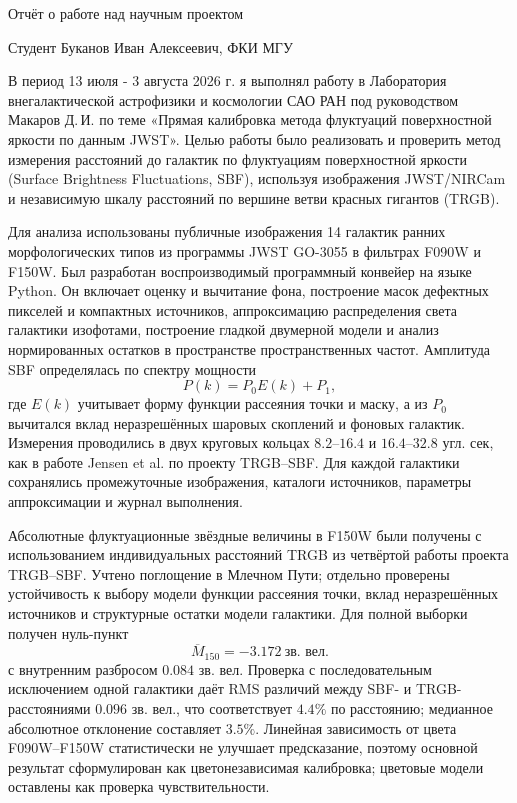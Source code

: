 \documentclass[11pt,letterpaper]{article}
\newcommand{\StudentName}{Буканов Иван Алексеевич}
\newcommand{\StudentOrganization}{ФКИ МГУ}
\newcommand{\ProjectPlace}{Лаборатория внегалактической астрофизики и космологии САО РАН}
\newcommand{\WorkPeriod}{13 июля - 3 августа 2026 г.}
\newcommand{\ProjectTitle}{Прямая калибровка метода флуктуаций поверхностной яркости по данным JWST}
\newcommand{\SupervisorName}{Макаров Д.\,И.}
\begin{document}
\begin{center}
  {\LARGE Отчёт о работе над научным проектом}
\end{center}

\vspace{4mm}

\noindent
Студент \StudentName, \StudentOrganization

\vspace{4mm}

В период \WorkPeriod{} я выполнял работу в \ProjectPlace{} под руководством
\SupervisorName{} по теме «\ProjectTitle». Целью работы было реализовать и
проверить метод измерения расстояний до галактик по флуктуациям поверхностной
яркости (Surface Brightness Fluctuations, SBF), используя изображения
JWST/NIRCam и независимую шкалу расстояний по вершине ветви красных гигантов
(TRGB).

Для анализа использованы публичные изображения 14 галактик ранних
морфологических типов из программы JWST GO-3055 в фильтрах F090W и F150W.
Был разработан воспроизводимый программный конвейер на языке Python. Он
включает оценку и вычитание фона, построение масок дефектных пикселей и
компактных источников, аппроксимацию распределения света галактики изофотами,
построение гладкой двумерной модели и анализ нормированных остатков в
пространстве пространственных частот. Амплитуда SBF определялась по спектру
мощности
\[
  P(k)=P_0E(k)+P_1,
\]
где $E(k)$ учитывает форму функции рассеяния точки и маску, а из $P_0$
вычитался вклад неразрешённых шаровых скоплений и фоновых галактик. Измерения
проводились в двух круговых кольцах $8.2$--$16.4$ и $16.4$--$32.8$ угл. сек,
как в работе Jensen et al. по проекту TRGB--SBF. Для каждой галактики
сохранялись промежуточные изображения, каталоги источников, параметры
аппроксимации и журнал выполнения.

Абсолютные флуктуационные звёздные величины в F150W были получены с
использованием индивидуальных расстояний TRGB из четвёртой работы проекта
TRGB--SBF. Учтено поглощение в Млечном Пути; отдельно проверены устойчивость к
выбору модели функции рассеяния точки, вклад неразрешённых источников и
структурные остатки модели галактики. Для полной выборки получен нуль-пункт
\[
  \overline{M}_{150}=-3.172\ \text{зв. вел.}
\]
с внутренним разбросом $0.084$ зв. вел. Проверка с последовательным
исключением одной галактики даёт RMS различий между SBF- и TRGB-расстояниями
$0.096$ зв. вел., что соответствует $4.4\%$ по расстоянию; медианное абсолютное
отклонение составляет $3.5\%$. Линейная зависимость от цвета
F090W--F150W статистически не улучшает предсказание, поэтому основной
результат сформулирован как цветонезависимая калибровка; цветовые модели
оставлены как проверка чувствительности.
\end{document}
